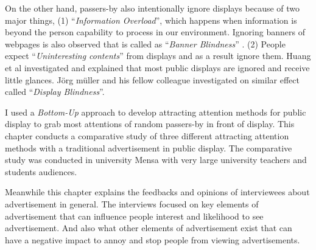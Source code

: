On the other hand, passers-by also intentionally ignore displays because of two major things, (1) ``\emph{Information Overload}'', which happens when information is beyond the person capability to process in our environment\cite{Information_overload}. Ignoring banners of webpages is also observed that is called as ``\emph{Banner Blindness}'' \cite{banner_blindness}. (2) People expect ``\emph{Uninteresting contents}'' from displays and as a result ignore them. Huang et al \cite{When_display} investigated and explained that most public displays are ignored and receive little glances. Jörg müller and his fellow colleague \cite{display_blindness} investigated on similar effect called ``\emph{Display Blindness}''. 


I used a \emph{Bottom-Up} approach to develop attracting attention methods for public display to grab most attentions of random passers-by in front of display. This chapter conducts a comparative study of three different attracting attention methods with a traditional advertisement in public display. The comparative study was conducted in university Mensa with very large university teachers and students audiences.

Meanwhile this chapter explains the feedbacks and opinions of interviewees about advertisement in general. The interviews focused on key elements of advertisement that can influence people interest and likelihood to see advertisement. And also what other elements of advertisement exist that can have a negative impact to annoy and stop people from viewing advertisements.






